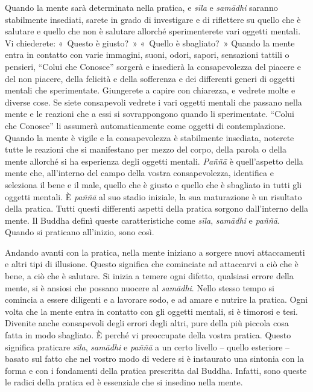 Quando la mente sarà determinata nella pratica, e \emph{sīla} e
\emph{samādhi} saranno stabilmente insediati, sarete in grado di
investigare e di riflettere su quello che è salutare e quello che non è
salutare allorché sperimenterete vari oggetti mentali. Vi chiederete:
«~Questo è giusto?~» «~Quello è sbagliato?~» Quando la mente entra in
contatto con varie immagini, suoni, odori, sapori, sensazioni tattili o
pensieri, ``Colui che Conosce'' sorgerà e insedierà la consapevolezza
del piacere e del non piacere, della felicità e della sofferenza e dei
differenti generi di oggetti mentali che sperimentate. Giungerete a
capire con chiarezza, e vedrete molte e diverse cose. Se siete
consapevoli vedrete i vari oggetti mentali che passano nella mente e le
reazioni che a essi si sovrappongono quando li sperimentate. ``Colui che
Conosce'' li assumerà automaticamente come oggetti di contemplazione.
Quando la mente è vigile e la consapevolezza è stabilmente insediata,
noterete tutte le reazioni che si manifestano per mezzo del corpo, della
parola o della mente allorché si ha esperienza degli oggetti mentali.
\emph{Paññā} è quell'aspetto della mente che, all'interno del campo
della vostra consapevolezza, identifica e seleziona il bene e il male,
quello che è giusto e quello che è sbagliato in tutti gli oggetti
mentali. È \emph{paññā} al suo stadio iniziale, la sua maturazione è un
risultato della pratica. Tutti questi differenti aspetti della pratica
sorgono dall'interno della mente. Il Buddha definì queste
caratteristiche come \emph{sīla}, \emph{samādhi} e \emph{paññā}. Quando
si praticano all'inizio, sono così.

Andando avanti con la pratica, nella mente iniziano a sorgere nuovi
attaccamenti e altri tipi di illusione. Questo significa che cominciate
ad attaccarvi a ciò che è bene, a ciò che è salutare. Si inizia a temere
ogni difetto, qualsiasi errore della mente, si è ansiosi che possano
nuocere al \emph{samādhi}. Nello stesso tempo si comincia a essere
diligenti e a lavorare sodo, e ad amare e nutrire la pratica. Ogni volta
che la mente entra in contatto con gli oggetti mentali, si è timorosi e
tesi. Divenite anche consapevoli degli errori degli altri, pure della
più piccola cosa fatta in modo sbagliato. È perché vi preoccupate della
vostra pratica. Questo significa praticare \emph{sīla}, \emph{samādhi} e
\emph{paññā} a un certo livello -- quello esteriore -- basato sul fatto
che nel vostro modo di vedere si è instaurato una sintonia con la forma
e con i fondamenti della pratica prescritta dal Buddha. Infatti, sono
queste le radici della pratica ed è essenziale che si insedino nella
mente.

